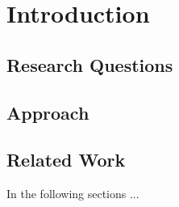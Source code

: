 \section{Introduction}
\label{sec:introduction}
\lipsum[1]

\subsection{Research Questions}
\lipsum[1]

\subsection{Approach}
\lipsum[2-3]

\subsection{Related Work}
\label{sec:related-work}
\lipsum[2-3]

In the following sections ...
